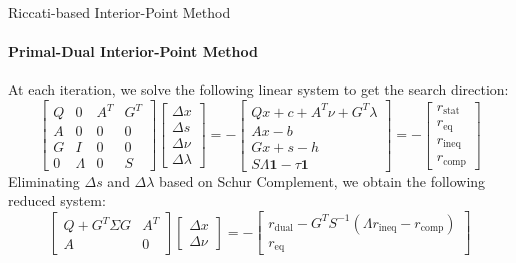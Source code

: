 \documentclass[10pt,aspectratio=1610]{beamer} %
\begin{document}
\begin{frame}{Riccati-based Interior-Point Method}
    \framesubtitle{Primal-Dual Interior-Point Method}
	At each iteration, we solve the following linear system to get the search direction:
	\begin{equation}
		\begin{bmatrix} 
		Q & 0 & A^T & G^T \\
		A & 0 & 0 & 0 \\
		G & I & 0 & 0 \\
		0 & \Lambda & 0 & S 
		\end{bmatrix}
		\begin{bmatrix} 
		\Delta x \\
		\Delta s \\
		\Delta \nu \\
		\Delta \lambda 
		\end{bmatrix} = -
		\begin{bmatrix} 
            Qx + c + A^T \nu + G^T \lambda \\
            Ax - b \\
            Gx + s - h \\
            S \Lambda \mathbf{1} - \tau \mathbf{1}
        \end{bmatrix} = -
		\begin{bmatrix} 
		r_{\text{stat}} \\
		r_{\text{eq}} \\
		r_{\text{ineq}} \\
		r_{\text{comp}}
		\end{bmatrix}
	\end{equation}
	Eliminating $\Delta s$ and $\Delta \lambda$ based on Schur Complement, we obtain the following reduced system:
	\begin{equation}
		\begin{bmatrix} 
		Q + G^T \Sigma G & A^T \\
		A & 0 
		\end{bmatrix}
		\begin{bmatrix} 
		\Delta x \\
		\Delta \nu 
		\end{bmatrix} = -
		\begin{bmatrix} 
		r_{\text{dual}} - G^T S^{-1} ( \Lambda r_{\text{ineq}} - r_{\text{comp}} ) \\
		r_{\text{eq}} 
		\end{bmatrix}
	\end{equation}

\end{frame}
\end{document}
